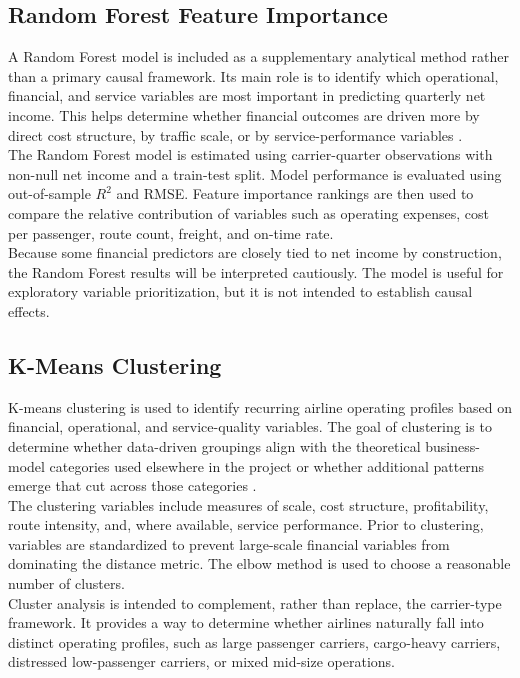 \documentclass[11pt, letterpaper]{article}
\begin{document}
\subsection{Random Forest Feature Importance}
A Random Forest model is included as a supplementary analytical method rather than a primary causal framework. Its main role is to identify which operational, financial, and service variables are most important in predicting quarterly net income. This helps determine whether financial outcomes are driven more by direct cost structure, by traffic scale, or by service-performance variables \cite{breiman2001}.\\
\indent The Random Forest model is estimated using carrier-quarter observations with non-null net income and a train-test split. Model performance is evaluated using out-of-sample \(R^2\) and RMSE. Feature importance rankings are then used to compare the relative contribution of variables such as operating expenses, cost per passenger, route count, freight, and on-time rate.\\
\indent Because some financial predictors are closely tied to net income by construction, the Random Forest results will be interpreted cautiously. The model is useful for exploratory variable prioritization, but it is not intended to establish causal effects.

\subsection{K-Means Clustering}
K-means clustering is used to identify recurring airline operating profiles based on financial, operational, and service-quality variables. The goal of clustering is to determine whether data-driven groupings align with the theoretical business-model categories used elsewhere in the project or whether additional patterns emerge that cut across those categories \cite{macqueen1967, kaya2023}.\\
\indent The clustering variables include measures of scale, cost structure, profitability, route intensity, and, where available, service performance. Prior to clustering, variables are standardized to prevent large-scale financial variables from dominating the distance metric. The elbow method is used to choose a reasonable number of clusters.\\
\indent Cluster analysis is intended to complement, rather than replace, the carrier-type framework. It provides a way to determine whether airlines naturally fall into distinct operating profiles, such as large passenger carriers, cargo-heavy carriers, distressed low-passenger carriers, or mixed mid-size operations.
\end{document}
